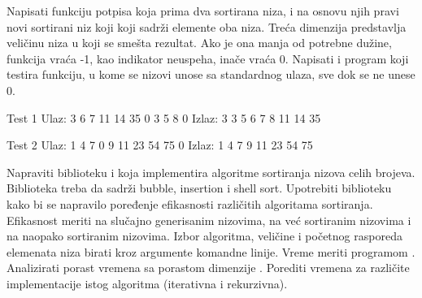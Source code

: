 \begin{Exercise}[label=505]
  Napisati funkciju potpisa  koja prima dva sortirana
  niza, i na osnovu njih pravi novi sortirani niz koji koji sadrži
  elemente oba niza. Treća dimenzija predstavlja veličinu niza u koji
  se smešta rezultat. Ako je ona manja od potrebne dužine, funkcija
  vraća -1, kao indikator neuspeha, inače vraća 0. Napisati i program
  koji testira funkciju, u kome se nizovi unose sa standardnog ulaza,
  sve dok se ne unese 0.
  
\begin{miditest}
\begin{test}{Test 1}
Ulaz:   3 6 7 11 14 35 0 3 5 8 0
Izlaz:  3 3 5 6 7 8 11 14 35
\end{test}
\end{miditest}

\begin{miditest}
\begin{test}{Test 2}
Ulaz:   1 4 7 0 9 11 23 54 75 0
Izlaz:  1 4 7 9 11 23 54 75
\end{test}
\end{miditest}
  
\end{Exercise}

\begin{Exercise}[label=506]
  Napraviti biblioteku  i  koja
  implementira algoritme sortiranja nizova celih brojeva. Biblioteka
  treba da sadrži bubble, insertion i shell sort. Upotrebiti
  biblioteku kako bi se napravilo poređenje efikasnosti različitih
  algoritama sortiranja. Efikasnost meriti na slučajno generisanim
  nizovima, na već sortiranim nizovima i na naopako sortiranim
  nizovima. Izbor algoritma, veličine i početnog rasporeda elemenata
  niza birati kroz argumente komandne linije.  Vreme meriti programom
  . Analizirati porast vremena sa porastom dimenzije
  . Porediti vremena za različite implementacije istog
  algoritma (iterativna i rekurzivna).
  
\end{Exercise}


